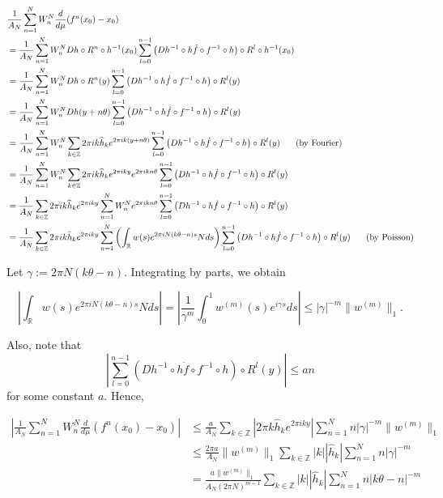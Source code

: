 \documentclass[12pt]{article}
\newcommand{\Z}{\mathbb{Z}}
\newcommand{\R}{\mathbb{R}}
\newcommand{\hk}{\widehat{h}_k}
\begin{document}
\begin{equation*}\begin{split}
&\frac{1}{A_N} \sum_{n=1}^{N} W_n^N \frac{d}{d\mu} (f^n(x_0)-x_0)\\
& = \frac{1}{A_N} \sum_{n=1}^{N} W_n^N Dh \circ R^n \circ h^{-1} (x_0) \sum_{l=0}^{n-1} \left(Dh^{-1}\circ h \Dot{f}\circ f^{-1}\circ h \right) \circ R^l \circ h^{-1}(x_0) \\
& = \frac{1}{A_N} \sum_{n=1}^{N} W_n^N Dh \circ R^n (y) \sum_{l=0}^{n-1} \left(Dh^{-1}\circ h \Dot{f}\circ f^{-1}\circ h \right) \circ R^l (y) \\
& = \frac{1}{A_N} \sum_{n=1}^{N} W_n^N  Dh (y+n\theta) \sum_{l=0}^{n-1} \left(Dh^{-1}\circ h \Dot{f}\circ f^{-1}\circ h \right) \circ R^l (y)\\
& = \frac{1}{A_N} \sum_{n=1}^{N} W_n^N \sum_{k\in\Z} 2\pi i k \hk e^{2 \pi i k (y+n\theta)} \sum_{l=0}^{n-1} \left( Dh^{-1}\circ h \Dot{f}\circ f^{-1}\circ h \right) \circ R^l (y) \text{\hspace{0.2in} (by Fourier) } \\
& = \frac{1}{A_N} \sum_{n=1}^{N} W_n^N \sum_{k\in\Z} 2\pi i k \hk e^{2 \pi i k y} e^{2 \pi i k n\theta} \sum_{l=0}^{n-1} \left( Dh^{-1}\circ h \Dot{f}\circ f^{-1}\circ h \right) \circ R^l (y) \\
& = \frac{1}{A_N} \sum_{k\in\Z} 2\pi i k \hk e^{2 \pi i k y} \sum_{n=1}^{N} W_n^N e^{2 \pi i k n\theta} \sum_{l=0}^{n-1} \left( Dh^{-1}\circ h \Dot{f}\circ f^{-1}\circ h \right) \circ R^l (y) \\
& = \frac{1}{A_N} \sum_{k\in\Z} 2\pi i k \hk e^{2 \pi i k y} \sum_{n=1}^{N} \left(\int_\R w(s)e^{2\pi i N (k\theta-n) s} N ds \right) \sum_{l=0}^{n-1} \left( Dh^{-1}\circ h \Dot{f}\circ f^{-1}\circ h \right) \circ R^l (y) \text{\hspace{0.2in} (by Poisson)}
\end{split}\end{equation*}

Let $\gamma := 2\pi N(k\theta-n)$. Integrating by parts, we obtain

$$\left| \int_\R w(s)e^{2\pi i N (k\theta-n) s} N ds \right| = \left| \frac{1}{\gamma^m} \int_0^1 w^{(m)}(s) e^{i\gamma s}ds \right| \leq |\gamma|^{-m} \|w^{(m)}\|_1.$$

Also, note that $$\left| \sum_{l=0}^{n-1} \left( Dh^{-1}\circ h \Dot{f}\circ f^{-1}\circ h \right) \circ R^l (y) \right| \leq an$$ for some constant $a$. Hence,

\begin{equation*}\begin{split}
\left| \frac{1}{A_N} \sum_{n=1}^{N} W_n^N \frac{d}{d\mu} (f^n(x_0)-x_0) \right|
& \leq \frac{a}{A_N} \sum_{k\in\Z} \left| 2\pi k \hk e^{2 \pi i k y} \right| \sum_{n=1}^{N} n |\gamma|^{-m} \|w^{(m)}\|_1 \\
& \leq \frac{2\pi a}{A_N} \|w^{(m)}\|_1 \sum_{k\in\Z} |k| \left| \hk \right| \sum_{n=1}^{N} n |\gamma|^{-m} \\
& = \frac{a\|w^{(m)}\|_1}{A_N (2\pi N)^{m-1}} \sum_{k\in\Z} |k| \left| \hk \right| \sum_{n=1}^{N} n |k\theta-n|^{-m}
\end{split}\end{equation*}
\end{document}
